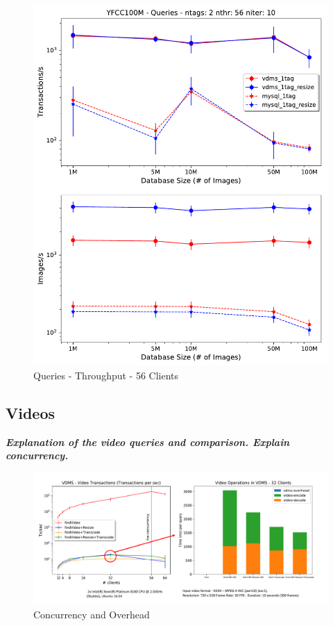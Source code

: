 \begin{figure}[t!]
\centering
\includegraphics[width=\columnwidth]{figures/queries_throughput_56}
\caption{Queries - Throughput - 56 Clients}
\label{fig:q_throughput_56}
\end{figure}

\subsection{Videos}

\textbf{\textit{Explanation of the video queries and comparison.
Explain concurrency.}}

\begin{figure}[]
\centering
\includegraphics[width=\textwidth]{figures/video_overhead}
\caption{Concurrency and Overhead}
\label{fig:video}
\end{figure}

